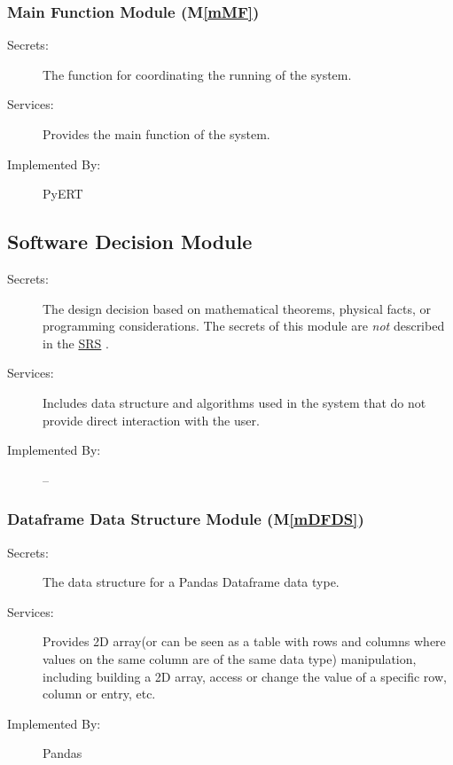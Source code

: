 \documentclass[12pt, titlepage]{article}
\newcommand{\mref}[1]{M\ref{#1}}
\begin{document}
\subsubsection{Main Function Module (\mref{mMF})}

\begin{description}
\item[Secrets:] The function for coordinating the running of the system.
\item[Services:] Provides the main function of the system.
\item[Implemented By:] PyERT
\end{description}


\subsection{Software Decision Module}

\begin{description}
\item[Secrets:] The design decision based on mathematical theorems, physical
  facts, or programming considerations. The secrets of this module are
  \emph{not} described in the \href{https://github.com/paezha/PyERT-BLACK/blob/main/docs/SRS/SRS.pdf}{SRS} \citep{SRS}.
\item[Services:] Includes data structure and algorithms used in the system that
  do not provide direct interaction with the user. 
\item[Implemented By:] --
\end{description}

\subsubsection{Dataframe Data Structure Module (\mref{mDFDS})}

\begin{description}
\item[Secrets:]The data structure for a Pandas Dataframe data type.
\item[Services:] Provides 2D array(or can be seen as a table with rows and columns where values on the same column are of the same data type) manipulation, including building a 2D array, access or change the value of a specific row, column or entry, etc.
\item[Implemented By:] Pandas
\end{description}
\end{document}
